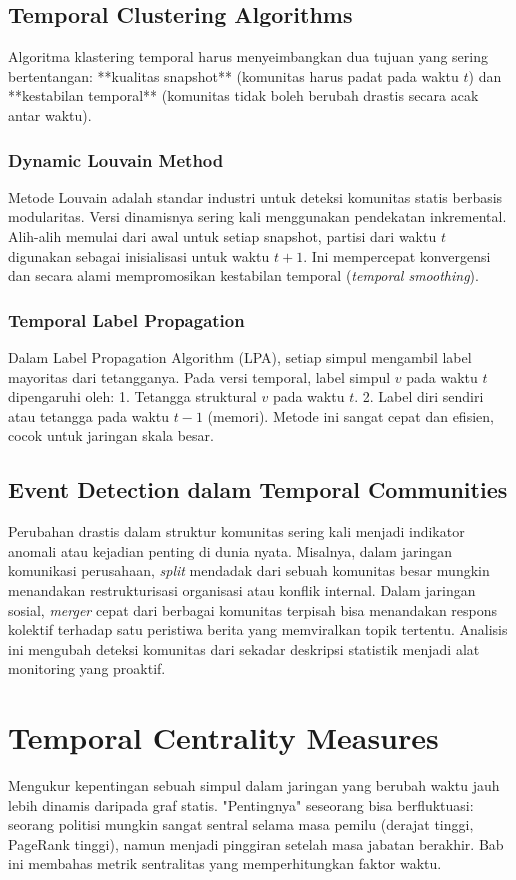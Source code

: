 \documentclass[12pt,a4paper]{book}
\begin{document}
\section{Temporal Clustering Algorithms}
Algoritma klastering temporal harus menyeimbangkan dua tujuan yang sering bertentangan: **kualitas snapshot** (komunitas harus padat pada waktu $t$) dan **kestabilan temporal** (komunitas tidak boleh berubah drastis secara acak antar waktu).

\subsection{Dynamic Louvain Method}
Metode Louvain adalah standar industri untuk deteksi komunitas statis berbasis modularitas. Versi dinamisnya sering kali menggunakan pendekatan inkremental.
Alih-alih memulai dari awal untuk setiap snapshot, partisi dari waktu $t$ digunakan sebagai inisialisasi untuk waktu $t+1$. Ini mempercepat konvergensi dan secara alami mempromosikan kestabilan temporal (\textit{temporal smoothing}).

\subsection{Temporal Label Propagation}
Dalam Label Propagation Algorithm (LPA), setiap simpul mengambil label mayoritas dari tetangganya. Pada versi temporal, label simpul $v$ pada waktu $t$ dipengaruhi oleh:
1. Tetangga struktural $v$ pada waktu $t$.
2. Label diri sendiri atau tetangga pada waktu $t-1$ (memori).
Metode ini sangat cepat dan efisien, cocok untuk jaringan skala besar.

\section{Event Detection dalam Temporal Communities}
Perubahan drastis dalam struktur komunitas sering kali menjadi indikator anomali atau kejadian penting di dunia nyata.
Misalnya, dalam jaringan komunikasi perusahaan, \textit{split} mendadak dari sebuah komunitas besar mungkin menandakan restrukturisasi organisasi atau konflik internal. Dalam jaringan sosial, \textit{merger} cepat dari berbagai komunitas terpisah bisa menandakan respons kolektif terhadap satu peristiwa berita yang memviralkan topik tertentu. Analisis ini mengubah deteksi komunitas dari sekadar deskripsi statistik menjadi alat monitoring yang proaktif.

\chapter{Temporal Centrality Measures}
Mengukur kepentingan sebuah simpul dalam jaringan yang berubah waktu jauh lebih dinamis daripada graf statis. "Pentingnya" seseorang bisa berfluktuasi: seorang politisi mungkin sangat sentral selama masa pemilu (derajat tinggi, PageRank tinggi), namun menjadi pinggiran setelah masa jabatan berakhir. Bab ini membahas metrik sentralitas yang memperhitungkan faktor waktu.
\end{document}
